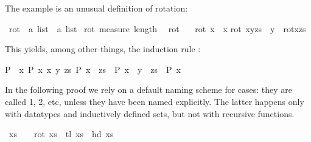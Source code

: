 \begin{isabellebody}
\begin{isamarkuptext}
The example is an unusual definition of rotation:%
\end{isamarkuptext}%
\isamarkuptrue%
\ rot\ {\isacharcolon}{\isacharcolon}\ {\isachardoublequote}{\isacharprime}a\ list\ {\isasymRightarrow}\ {\isacharprime}a\ list{\isachardoublequote}\isanewline
\isamarkupfalse%
\ rot\ {\isachardoublequote}measure\ length{\isachardoublequote}\ \ %
\isanewline
{\isachardoublequote}rot\ {\isacharbrackleft}{\isacharbrackright}\ {\isacharequal}\ {\isacharbrackleft}{\isacharbrackright}{\isachardoublequote}\isanewline
{\isachardoublequote}rot\ {\isacharbrackleft}x{\isacharbrackright}\ {\isacharequal}\ {\isacharbrackleft}x{\isacharbrackright}{\isachardoublequote}\isanewline
{\isachardoublequote}rot\ {\isacharparenleft}x{\isacharhash}y{\isacharhash}zs{\isacharparenright}\ {\isacharequal}\ y\ {\isacharhash}\ rot{\isacharparenleft}x{\isacharhash}zs{\isacharparenright}{\isachardoublequote}\isamarkupfalse%
%
\begin{isamarkuptext}%
\noindent This yields, among other things, the induction rule
: \begin{isabelle}%
{\isasymlbrakk}P\ {\isacharbrackleft}{\isacharbrackright}{\isacharsemicolon}\ {\isasymAnd}x{\isachardot}\ P\ {\isacharbrackleft}x{\isacharbrackright}{\isacharsemicolon}\ {\isasymAnd}x\ y\ zs{\isachardot}\ P\ {\isacharparenleft}x\ {\isacharhash}\ zs{\isacharparenright}\ {\isasymLongrightarrow}\ P\ {\isacharparenleft}x\ {\isacharhash}\ y\ {\isacharhash}\ zs{\isacharparenright}{\isasymrbrakk}\ {\isasymLongrightarrow}\ P\ x%
\end{isabelle}
In the following proof we rely on a default naming scheme for cases: they are
called 1, 2, etc, unless they have been named explicitly. The latter happens
only with datatypes and inductively defined sets, but not with recursive
functions.%
\end{isamarkuptext}%
\isamarkuptrue%
\ {\isachardoublequote}xs\ {\isasymnoteq}\ {\isacharbrackleft}{\isacharbrackright}\ {\isasymLongrightarrow}\ rot\ xs\ {\isacharequal}\ tl\ xs\ {\isacharat}\ {\isacharbrackleft}hd\ xs{\isacharbrackright}{\isachardoublequote}\isanewline
\isamarkupfalse%
\isamarkupfalse%
\isamarkupfalse%
\isamarkupfalse%
\isamarkupfalse%
\isamarkupfalse%
\isamarkupfalse%
\isamarkupfalse%
\isamarkupfalse%
\isamarkupfalse%
\isamarkupfalse%
\isamarkupfalse%
\isamarkupfalse%
\isamarkupfalse%
\isamarkupfalse%
\isamarkupfalse%
\isamarkupfalse%
\isamarkupfalse%
\isamarkupfalse%

\end{isabellebody}

